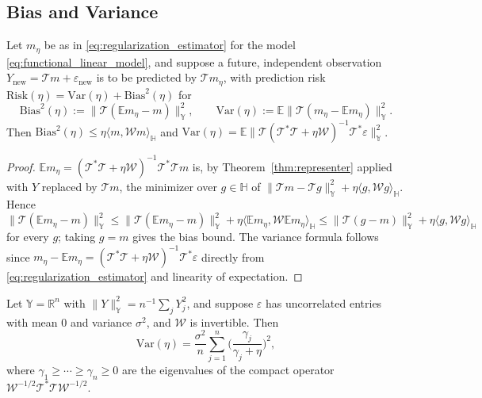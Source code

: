 \subsection{Bias and Variance}
\label{subsec:bias_variance}

\begin{theorem}
\label{thm:bias_variance}
Let $m_\eta$ be as in \eqref{eq:regularization_estimator} for the model
\eqref{eq:functional_linear_model}, and suppose a future, independent
observation $Y_{\mathrm{new}}=\mathcal{T}m+\varepsilon_{\mathrm{new}}$ is to
be predicted by $\mathcal{T}m_\eta$, with prediction risk $\mathrm{Risk}
(\eta) = \mathrm{Var}(\eta)+\mathrm{Bias}^2(\eta)$ for
\begin{equation}
\mathrm{Bias}^2(\eta) := \|\mathcal{T}(\mathbb{E}m_\eta-m)\|_{\mathbb{Y}}^2,
\qquad
\mathrm{Var}(\eta) := \mathbb{E}\|\mathcal{T}(m_\eta-\mathbb{E}m_\eta)
\|_{\mathbb{Y}}^2.
\label{eq:bias_variance_def}
\end{equation}
Then $\mathrm{Bias}^2(\eta)\leq\eta\langle m,\mathcal{W}m\rangle_{\mathbb{H}}$
and $\mathrm{Var}(\eta) = \mathbb{E}\|\mathcal{T}(\mathcal{T}^*\mathcal{T}+
\eta\mathcal{W})^{-1}\mathcal{T}^*\varepsilon\|_{\mathbb{Y}}^2$.
\end{theorem}

\begin{proof}
$\mathbb{E}m_\eta = (\mathcal{T}^*\mathcal{T}+\eta\mathcal{W})^{-1}
\mathcal{T}^*\mathcal{T}m$ is, by Theorem~\ref{thm:representer} applied
with $Y$ replaced by $\mathcal{T}m$, the minimizer over $g\in\mathbb{H}$ of
$\|\mathcal{T}m-\mathcal{T}g\|_{\mathbb{Y}}^2+\eta\langle g,\mathcal{W}g
\rangle_{\mathbb{H}}$. Hence $\|\mathcal{T}(\mathbb{E}m_\eta-m)\|_{
\mathbb{Y}}^2 \leq \|\mathcal{T}(\mathbb{E}m_\eta-m)\|_{\mathbb{Y}}^2+
\eta\langle\mathbb{E}m_\eta,\mathcal{W}\mathbb{E}m_\eta\rangle_{\mathbb{H}}
\leq \|\mathcal{T}(g-m)\|_{\mathbb{Y}}^2+\eta\langle g,\mathcal{W}g
\rangle_{\mathbb{H}}$ for every $g$; taking $g=m$ gives the bias bound. The
variance formula follows since $m_\eta-\mathbb{E}m_\eta = (\mathcal{T}^*
\mathcal{T}+\eta\mathcal{W})^{-1}\mathcal{T}^*\varepsilon$ directly from
\eqref{eq:regularization_estimator} and linearity of expectation.
\end{proof}

\begin{corollary}
\label{cor:variance_eigenvalues}
Let $\mathbb{Y}=\mathbb{R}^n$ with $\|Y\|_{\mathbb{Y}}^2=n^{-1}\sum_jY_j^2$,
and suppose $\varepsilon$ has uncorrelated entries with mean $0$ and
variance $\sigma^2$, and $\mathcal{W}$ is invertible. Then
\begin{equation}
\mathrm{Var}(\eta) = \frac{\sigma^2}{n}\sum_{j=1}^n\Big(\frac{\gamma_j}{
\gamma_j+\eta}\Big)^2,
\label{eq:variance_eigenvalues}
\end{equation}
where $\gamma_1\geq\cdots\geq\gamma_n\geq 0$ are the eigenvalues of the
compact operator $\mathcal{W}^{-1/2}\mathcal{T}^*\mathcal{T}\mathcal{W}^{
-1/2}$.
\end{corollary}

